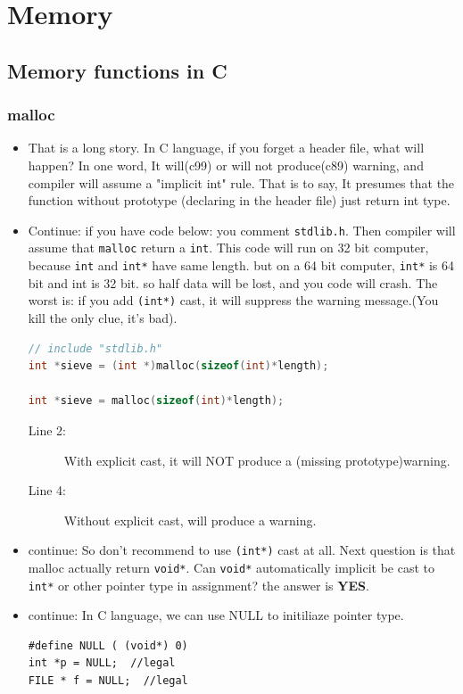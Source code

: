 \documentclass[a4paper,11pt,twoside]{book}
\begin{document}
\chapter{Memory}

\section{Memory functions in C}
\subsection{malloc}
\begin{itemize}
	\item That is a long story. In C language, if you forget a header file, what will happen? In one word, It will(c99) or will not produce(c89) warning, and compiler will assume a "implicit int" rule. That is to say, It presumes that the function without prototype (declaring in the header file) just return int type.
	
	\item Continue: if you have code below: you comment \texttt{stdlib.h}. Then compiler will assume that \texttt{malloc} return a \texttt{int}.  This code will run on 32 bit computer, because \texttt{int} and \texttt{int*} have same length. but on a 64 bit computer, \texttt{int*} is 64 bit and int is 32 bit.  so half data will be lost, and you code will crash. The worst is: if you add \texttt{(int*)} cast, it will suppress the warning message.(You kill the only clue, it's bad).
\begin{lstlisting}[frame=single, language=c++]
// include "stdlib.h"
int *sieve = (int *)malloc(sizeof(int)*length);
	
int *sieve = malloc(sizeof(int)*length);
\end{lstlisting}
\begin{description}
	\item[Line 2:] With explicit cast, it will NOT produce a (missing prototype)warning.
	\item[Line 4:] Without explicit cast, will produce a warning.
\end{description}

	\item continue: So don't recommend to use \texttt{(int*)} cast at all. Next question is that malloc actually return \texttt{void*}. Can \texttt{void*} automatically implicit be cast to \texttt{int*} or other pointer type in assignment? the answer is \textbf{YES}.
	
	\item  continue: In C language, we can use NULL to initiliaze pointer type.
\begin{lstlisting}[numbers=none]
#define NULL ( (void*) 0)
int *p = NULL;  //legal
FILE * f = NULL;  //legal
\end{lstlisting}
	

\end{itemize}
\end{document}
